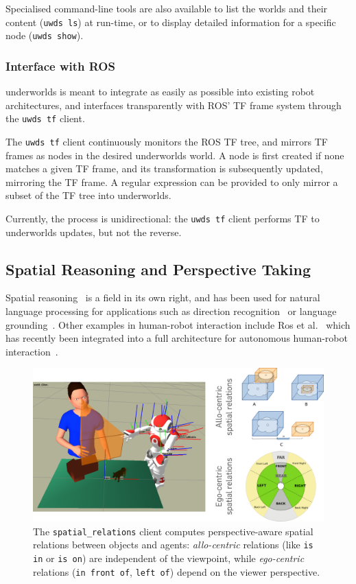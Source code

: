 \documentclass[letterpaper, 10pt, conference]{ieeeconf}
\newcommand{\etal}{et al.\xspace}
\newcommand{\uwds}{{\sc underworlds}\xspace}
\begin{document}
Specialised command-line tools are also available to list the worlds
and their content ({\tt uwds ls}) at run-time, or to display detailed information for a
specific node ({\tt uwds show}).

\subsubsection{Interface with ROS}

\uwds is meant to integrate as easily as possible into existing robot
architectures, and interfaces transparently with ROS' TF frame system through
the {\tt uwds tf} client.

The {\tt uwds tf} client continuously monitors the ROS TF tree, and mirrors
TF frames as nodes in the desired \uwds world. A node is first created if none
matches a given TF frame, and its transformation is subsequently updated,
mirroring the TF frame. A regular expression can be provided to only mirror a
subset of the TF tree into \uwds.

Currently, the process is unidirectional: the {\tt uwds tf} client performs TF
to \uwds updates, but not the reverse.

\subsection{Spatial Reasoning and Perspective Taking}

Spatial reasoning~\cite{O'Keefe1999} is a field in its own right, and has been
used for natural language processing for applications such as direction
recognition~\cite{Kollar2010,Matuszek2010} or language
grounding~\cite{Tellex2010}. Other examples in human-robot interaction include Ros
\etal~\cite{ros2010solving, ros2010which} which has recently been integrated
into a full architecture for autonomous human-robot
interaction~\cite{lemaignan2016artificial}.

\begin{figure}
    \centering
    \includegraphics[width=\linewidth]{spatialrelations}
    \caption{The {\tt spatial\_relations} client computes perspective-aware
    spatial relations between objects and agents: \emph{allo-centric} relations (like
    {\tt is in} or {\tt is on}) are independent of the viewpoint, while
    \emph{ego-centric} relations ({\tt in front of}, {\tt left of}) depend on
    the viewer perspective.}
    \label{fig|spatialrelations}
\end{figure}
\end{document}
